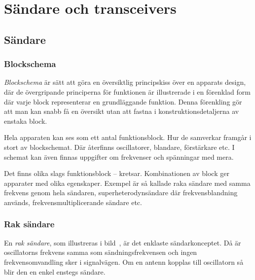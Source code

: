 \chapter[Sändare]{Sändare och transceivers}

\section{Sändare}
\label{sändare}

\subsection{Blockschema}
\label{sändare_blockschema}

\emph{Blockschema} är sätt att göra en översiktlig principskiss över en
apparats design, där de övergripande principerna för funktionen är illustrerade
i en förenklad form där varje block representerar en grundläggande funktion.
Denna förenkling gör att man kan snabb få en översikt utan att fastna i
konstruktionsdetaljerna av enstaka block.

Hela apparaten kan ses som ett antal funktionsblock.
Hur de samverkar framgår i stort av blockschemat.
Där återfinns oscillatorer, blandare, förstärkare etc.
I schemat kan även finnas uppgifter om frekvenser och spänningar med mera.

Det finns olika slags funktionsblock -- kretsar.
Kombinationen av block ger apparater med olika egenskaper.
Exempel är så kallade raka sändare med samma frekvens genom hela sändaren,
superheterodynsändare där frekvensblandning används,
frekvensmultiplicerande sändare etc.



\subsection{Rak sändare}

En \emph{rak sändare}, som illustreras i bild~, är det
enklaste sändarkonceptet.
Då är oscillatorns frekvens samma som sändningsfrekvensen och ingen
frekvensomvandling sker i signalvägen.
Om en antenn kopplas till oscillatorn så blir den en enkel enstegs sändare.

